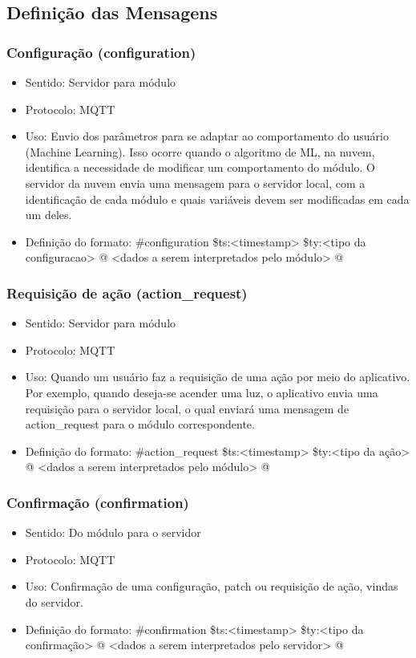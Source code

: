 \subsection{Definição das Mensagens}
\subsubsection{Configuração (configuration)}
\begin{itemize}
\item Sentido: Servidor para módulo
\item Protocolo: MQTT
\item Uso: Envio dos parâmetros para se adaptar ao comportamento do usuário (Machine Learning). Isso ocorre quando o algoritmo de ML, na nuvem, identifica a necessidade de modificar um comportamento do módulo. O servidor da nuvem envia uma mensagem para o servidor local, com a identificação de cada módulo e quais variáveis devem ser modificadas em cada um deles.
\item Definição do formato:
#configuration
\$ts:<timestamp>
\$ty:<tipo da configuracao>
@
<dados a serem interpretados pelo módulo>
@
\end{itemize}

\subsubsection{Requisição de ação (action_request)}
\begin{itemize}
\item Sentido: Servidor para módulo
\item Protocolo: MQTT
\item Uso: Quando um usuário faz a requisição de uma ação por meio do aplicativo. Por exemplo, quando deseja-se acender uma luz, o aplicativo envia uma requisição para o servidor local, o qual enviará uma mensagem de action_request para o módulo correspondente.
\item Definição do formato:
#action_request
\$ts:<timestamp>
\$ty:<tipo da ação>
@
<dados a serem interpretados pelo módulo>
@
\end{itemize}

\subsubsection{Confirmação (confirmation)}
\begin{itemize}
\item Sentido: Do módulo para o servidor
\item Protocolo: MQTT
\item Uso: Confirmação de uma configuração, patch ou requisição de ação, vindas do servidor.
\item Definição do formato:
#confirmation
\$ts:<timestamp>
\$ty:<tipo da confirmação>
@
<dados a serem interpretados pelo servidor>
@
\end{itemize}

